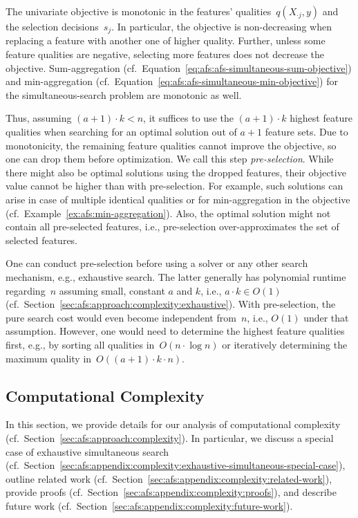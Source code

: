\documentclass{article}
\theoremstyle{definition}
\begin{document}
The univariate objective is monotonic in the features' qualities~$q(X_{\cdot{}j},y)$ and the selection decisions~$s_j$.
In particular, the objective is non-decreasing when replacing a feature with another one of higher quality.
Further, unless some feature qualities are negative, selecting more features does not decrease the objective.
Sum-aggregation (cf.~Equation~\ref{eq:afs:afs-simultaneous-sum-objective}) and min-aggregation (cf.~Equation~\ref{eq:afs:afs-simultaneous-min-objective}) for the simultaneous-search problem are monotonic as well.

Thus, assuming $(a + 1) \cdot k < n$, it suffices to use the $(a + 1) \cdot k$ highest feature qualities when searching for an optimal solution out of $a + 1$ feature sets.
Due to monotonicity, the remaining feature qualities cannot improve the objective, so one can drop them before optimization.
We call this step \emph{pre-selection}.
While there might also be optimal solutions using the dropped features, their objective value cannot be higher than with pre-selection.
For example, such solutions can arise in case of multiple identical qualities or for min-aggregation in the objective (cf.~Example~\ref{ex:afs:min-aggregation}).
Also, the optimal solution might not contain all pre-selected features, i.e., pre-selection over-approximates the set of selected features.

One can conduct pre-selection before using a solver or any other search mechanism, e.g., exhaustive search.
The latter generally has polynomial runtime regarding~$n$ assuming small, constant $a$ and $k$, i.e., $a \cdot k \in O(1)$ (cf.~Section~\ref{sec:afs:approach:complexity:exhaustive}).
With pre-selection, the pure search cost would even become independent from~$n$, i.e., $O(1)$ under that assumption.
However, one would need to determine the highest feature qualities first, e.g., by sorting all qualities in~$O(n \cdot \log n)$ or iteratively determining the maximum quality in~$O((a+1) \cdot k \cdot n)$.

\subsection{Computational Complexity}
\label{sec:afs:appendix:complexity}

In this section, we provide details for our analysis of computational complexity (cf.~Section~\ref{sec:afs:approach:complexity}).
In particular, we discuss a special case of exhaustive simultaneous search (cf.~Section~\ref{sec:afs:appendix:complexity:exhaustive-simultaneous-special-case}), outline related work (cf.~Section~\ref{sec:afs:appendix:complexity:related-work}), provide proofs (cf.~Section~\ref{sec:afs:appendix:complexity:proofs}), and describe future work (cf.~Section~\ref{sec:afs:appendix:complexity:future-work}).
\end{document}

